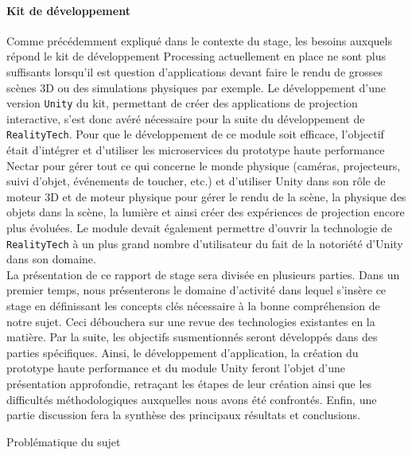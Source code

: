 \paragraph{Kit de développement} Comme précédemment expliqué dans le contexte du stage, les besoins auxquels répond le kit de développement Processing actuellement en place ne sont plus suffisants lorsqu'il est question d'applications devant faire le rendu de grosses scènes 3D ou des simulations physiques par exemple. Le développement d'une version \texttt{Unity} du kit, permettant de créer des applications de projection interactive, s'est donc avéré nécessaire pour la suite du développement de \texttt{RealityTech}. Pour que le développement de ce module soit efficace, l'objectif était d'intégrer et d'utiliser les microservices du prototype haute performance Nectar pour gérer tout ce qui concerne le monde physique (caméras, projecteurs, suivi d'objet, événements de toucher, etc.) et d'utiliser Unity dans son rôle de moteur 3D et de moteur physique pour gérer le rendu de la scène, la physique des objets dans la scène, la lumière et ainsi créer des expériences de projection encore plus évoluées. Le module devait également permettre d'ouvrir la technologie de \texttt{RealityTech} à un plus grand nombre d'utilisateur du fait de la notoriété d'Unity dans son domaine.\\

La présentation de ce rapport de stage sera divisée en plusieurs parties. Dans un premier temps, nous présenterons le domaine d'activité dans lequel s'insère ce stage en définissant les concepts clés nécessaire à la bonne compréhension de notre sujet. Ceci débouchera sur une revue des technologies existantes en la matière. Par la suite, les objectifs susmentionnés seront développés dans des parties spécifiques. Ainsi, le développement d'application, la création du prototype haute performance et du module Unity feront l'objet d'une présentation approfondie, retraçant les étapes de leur création ainsi que les difficultés méthodologiques auxquelles nous avons été confrontés. Enfin, une partie discussion fera la synthèse des principaux résultats et conclusions.

\begin{center}
Problématique du sujet
\end{center}

